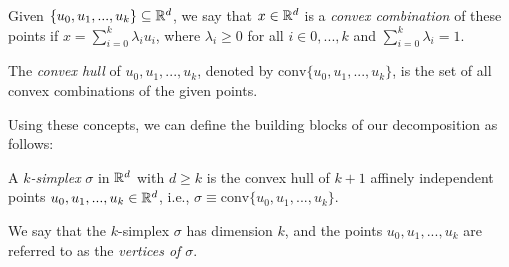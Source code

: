 \documentclass[../main.tex]{subfiles}
\begin{document}
\begin{definition}
\begin{sloppypar}
Given $\{u_0, u_1, ..., u_k\} \subseteq \mathbb{R}^d$, we say that $x \in \mathbb{R}^d$ is a \emph{convex combination} of these points if $x = \sum_{i=0}^{k} \lambda_i u_i$, where $\lambda_i \geq 0$ for all $i \in {0,...,k}$ and $\sum_{i=0}^{k} \lambda_i = 1$.
\end{sloppypar}
\end{definition}

\begin{definition}
\begin{sloppypar}
The \emph{convex hull} of $u_0, u_1, ..., u_k$, denoted by ${\text{conv}\{u_0, u_1, ..., u_k\}}$, is the set of all convex combinations of the given points.
\end{sloppypar}
\end{definition}

Using these concepts, we can define the building blocks of our decomposition as follows:

\begin{definition}
A \emph{$k$-simplex} $\sigma$ in $\mathbb{R}^d$ with $d \geq k$ is the convex hull of $k+1$ affinely independent points $u_0, u_1, ..., u_k \in \mathbb{R}^d$, i.e.,
$\sigma \equiv \text{conv}\{u_0, u_1, ..., u_k\}$.
\end{definition}

We say that the $k$-simplex $\sigma$ has dimension $k$, and the points $u_0, u_1, ..., u_k$ are referred to as the \emph{vertices of $\sigma$}.
\end{document}

